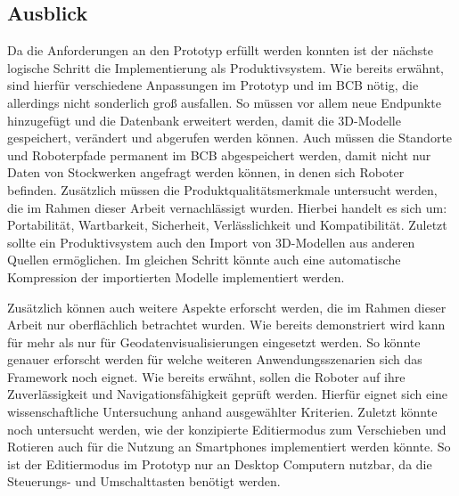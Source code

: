 
\subsection{Ausblick}
Da die Anforderungen an den Prototyp erfüllt werden konnten ist der nächste logische Schritt die Implementierung als Produktivsystem. Wie bereits erwähnt, sind hierfür verschiedene Anpassungen im Prototyp und im \ac{BCB} nötig, die allerdings nicht sonderlich groß ausfallen. So müssen vor allem neue Endpunkte hinzugefügt und die Datenbank erweitert werden, damit die 3D-Modelle gespeichert, verändert und abgerufen werden können. Auch müssen die Standorte und Roboterpfade permanent im \ac{BCB} abgespeichert werden, damit nicht nur Daten von Stockwerken angefragt werden können, in denen sich Roboter befinden. Zusätzlich müssen die Produktqualitätsmerkmale untersucht werden, die im Rahmen dieser Arbeit vernachlässigt wurden. Hierbei handelt es sich um: Portabilität, Wartbarkeit, Sicherheit, Verlässlichkeit und Kompatibilität. Zuletzt sollte ein Produktivsystem auch den Import von 3D-Modellen aus anderen Quellen ermöglichen. Im gleichen Schritt könnte auch eine automatische Kompression der importierten Modelle implementiert werden.

Zusätzlich können auch weitere Aspekte erforscht werden, die im Rahmen dieser Arbeit nur oberflächlich betrachtet wurden. Wie bereits demonstriert wird kann \deckgl{} für mehr als nur für Geodatenvisualisierungen eingesetzt werden. So könnte genauer erforscht werden für welche weiteren Anwendungsszenarien sich das Framework noch eignet. Wie bereits erwähnt, sollen die Roboter auf ihre Zuverlässigkeit und Navigationsfähigkeit geprüft werden. Hierfür eignet sich eine wissenschaftliche Untersuchung anhand ausgewählter Kriterien. Zuletzt könnte noch untersucht werden, wie der konzipierte Editiermodus zum Verschieben und Rotieren auch für die Nutzung an Smartphones implementiert werden könnte. So ist der Editiermodus im Prototyp nur an Desktop Computern nutzbar, da die Steuerungs- und Umschalttasten benötigt werden.

